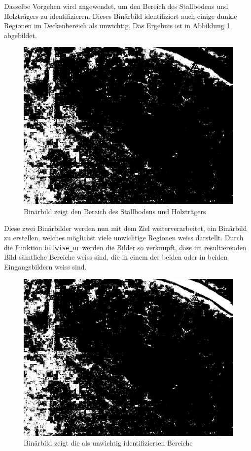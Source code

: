 Dasselbe Vorgehen wird angewendet, um den Bereich des Stallbodens und Holzträgers zu identifizieren. Dieses Binärbild identifiziert auch einige dunkle Regionen im Deckenbereich als unwichtig. Das Ergebnis ist in Abbildung \ref{fig: Binärbild zeigt den Bereich des Stallbodens und Holzträgers} abgebildet.
\begin{figure}[H]
	\center
	\includegraphics[scale=0.25]{Grafiken/entwicklung/4binBildHolz.jpg}
	\caption{Binärbild zeigt den Bereich des Stallbodens und Holzträgers} 
	\label{fig: Binärbild zeigt den Bereich des Stallbodens und Holzträgers}
\end{figure}

Diese zwei Binärbilder werden nun mit dem Ziel weiterverarbeitet, ein Binärbild zu erstellen, welches möglichst viele unwichtige Regionen weiss darstellt. Durch die Funktion \texttt{bitwise_or} werden die Bilder so verknüpft, dass im resultierenden Bild sämtliche Bereiche weiss sind, die in einem der beiden oder in beiden Eingangsbildern weiss sind.
\begin{figure}[H]
	\center
	\includegraphics[scale=0.25]{Grafiken/entwicklung/5binLampeUndHolz.jpg}
	\caption{Binärbild zeigt die als unwichtig identifizierten Bereiche} 
	\label{fig: Binärbild zeigt sämtliche als unwichtig identifizierten Bereiche}
\end{figure}

